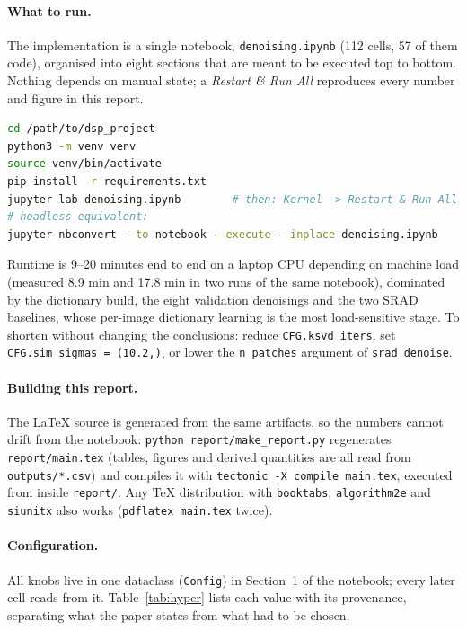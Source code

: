 \documentclass[11pt,a4paper]{article}
\begin{document}
\paragraph{What to run.}
The implementation is a single notebook, \texttt{denoising.ipynb} (112{} cells, 57{} of them code), organised
into eight sections that are meant to be executed top to bottom. Nothing depends on manual state; a
\emph{Restart \& Run All} reproduces every number and figure in this report.

\begin{lstlisting}[style=plain,language=bash]
cd /path/to/dsp_project
python3 -m venv venv
source venv/bin/activate
pip install -r requirements.txt
jupyter lab denoising.ipynb        # then: Kernel -> Restart & Run All
# headless equivalent:
jupyter nbconvert --to notebook --execute --inplace denoising.ipynb
\end{lstlisting}

Runtime is 9--20 minutes end to end on a laptop CPU depending on machine load (measured 8.9 min and 17.8 min in two
runs of the same notebook), dominated by the dictionary build, the eight validation denoisings and the two SRAD
baselines, whose per-image dictionary learning is the most load-sensitive stage. To shorten without changing the
conclusions: reduce \texttt{CFG.ksvd\_iters}, set \texttt{CFG.sim\_sigmas = (10.2,)}, or lower the \texttt{n\_patches}
argument of \texttt{srad\_denoise}.

\paragraph{Building this report.}
The \LaTeX{} source is generated from the same artifacts, so the numbers cannot drift from the notebook:
\texttt{python report/make\_report.py} regenerates \texttt{report/main.tex} (tables, figures and derived quantities
are all read from \texttt{outputs/*.csv}) and compiles it with \texttt{tectonic -X compile main.tex}, executed from
inside \texttt{report/}. Any \TeX{} distribution with \texttt{booktabs}, \texttt{algorithm2e} and \texttt{siunitx}
also works (\texttt{pdflatex main.tex} twice).

\paragraph{Configuration.}
All knobs live in one dataclass (\texttt{Config}) in Section~1 of the notebook; every later cell reads from it.
Table~\ref{tab:hyper} lists each value with its provenance, separating what the paper states from what had to be
chosen.
\end{document}
